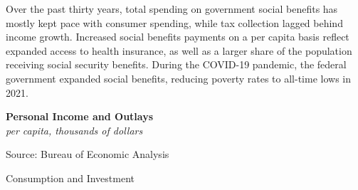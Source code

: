 \documentclass{report}
\makeatletter
\newcommand{\tbllink}[1]{\href{https://raw.githubusercontent.com/bdecon/US-chartbook/master/chartbook/data/#1}{\faTable}}
\newcommand*\short[1]{\expandafter\@gobbletwo\number\numexpr#1\relax}
\newcommand{\stdnode}[3]{\node[below, align=left, shift=({#1,#2})]{#3};}
\newcommand{\absnode}[3]{\node[below right, align=left] at (axis cs: #1,#2) {#3};}
\newcommand{\shdateaxisticks}{
		date coordinates in=x, axis line style={draw=none},
		xmax={2023-11-30},
		max space between ticks=40,	    
		xtick={{1990-01-01}, {1995-01-01}, {2000-01-01}, 
			{2005-01-01}, {2010-01-01}, {2015-01-01}, {2020-01-01}},
		minor xtick={},
		enlarge y limits={0.06}, enlarge x limits={0.01},
		xticklabel style={align=center, yshift=-2pt}, tick label style={inner sep=0pt},
		}
\newcommand{\bbar}[2]{extra #1 ticks = {{#2}}, extra #1 tick labels = ,
		extra #1 tick style = {grid=major, grid style={thick, black!25}},}
\newcommand{\stdline}[4]{\addplot[very thick, no markers, color=#1] 
		table [x=#2, y=#3, col sep=comma] {#4};	}
\newcommand{\rbars}{
		\fill[color=black!10] (axis cs:{1990-07-01},\pgfkeysvalueof{/pgfplots/ymin}) rectangle 
			(axis cs:{1991-03-01}, \pgfkeysvalueof{/pgfplots/ymax});
		\fill[color=black!10] (axis cs:{2007-12-01},\pgfkeysvalueof{/pgfplots/ymin}) rectangle 
			(axis cs:{2009-07-01}, \pgfkeysvalueof{/pgfplots/ymax});
		\fill[color=black!10] (axis cs:{2001-03-01},\pgfkeysvalueof{/pgfplots/ymin}) rectangle 
			(axis cs:{2001-11-01}, \pgfkeysvalueof{/pgfplots/ymax});
		\fill[color=black!10] (axis cs:{2020-02-01},\pgfkeysvalueof{/pgfplots/ymin}) rectangle 
			(axis cs:{2020-05-01}, \pgfkeysvalueof{/pgfplots/ymax});}
\makeatother
\begin{document}
{\begin{minipage}{0.76\textwidth}
Over the past thirty years, total spending on government social benefits has mostly kept pace with consumer spending, while tax collection lagged behind income growth. Increased social benefits payments on a per capita basis reflect expanded access to health insurance, as well as a larger share of the population receiving social security benefits. During the COVID-19 pandemic, the federal government expanded social benefits, reducing poverty rates to all-time lows in 2021. 
\end{minipage}
\vspace{1mm}

\begin{minipage}{0.38\textwidth}
\normalsize \textbf{Personal Income and Outlays}\\
\footnotesize{\textit{per capita, thousands of dollars}}
\vspace{3.5cm}

\hspace{2mm} 

\footnotesize{Source: Bureau of Economic Analysis} \hfill \tbllink{govpi.csv}
\end{minipage}\hspace{5mm}
\begin{minipage}{0.34\textwidth}
\small 
\end{minipage}
\vspace{3mm}

\begin{minipage}{0.76\textwidth}
\normalsize Consumption and Investment
\vspace{-1mm}


\end{minipage}}
\end{document}
